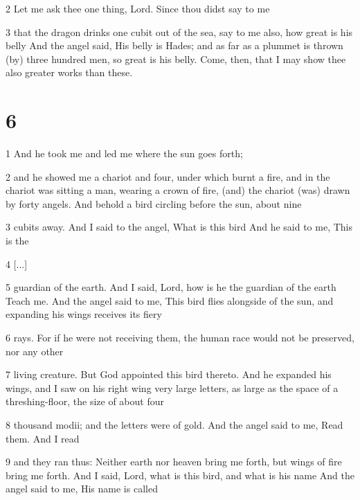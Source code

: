 \par 2 Let me ask thee one thing, Lord. Since thou didst say to me

\par 3 that the dragon drinks one cubit out of the sea, say to me also, how great is his belly And the angel said, His belly is Hades; and as far as a plummet is thrown (by) three hundred men, so great is his belly. Come, then, that I may show thee also greater works than these.

\chapter{6}

\par 1 And he took me and led me where the sun goes forth;

\par 2 and he showed me a chariot and four, under which burnt a fire, and in the chariot was sitting a man, wearing a crown of fire, (and) the chariot (was) drawn by forty angels. And behold a bird circling before the sun, about nine

\par 3 cubits away. And I said to the angel, What is this bird And he said to me, This is the 

\par 4 [...]

\par 5 guardian of the earth. And I said, Lord, how is he the guardian of the earth Teach me. And the angel said to me, This bird flies alongside of the sun, and expanding his wings receives its fiery

\par 6 rays. For if he were not receiving them, the human race would not be preserved, nor any other

\par 7 living creature. But God appointed this bird thereto. And he expanded his wings, and I saw on his right wing very large letters, as large as the space of a threshing-floor, the size of about four

\par 8 thousand modii; and the letters were of gold. And the angel said to me, Read them. And I read

\par 9 and they ran thus: Neither earth nor heaven bring me forth, but wings of fire bring me forth. And I said, Lord, what is this bird, and what is his name And the angel said to me,  His name is called

